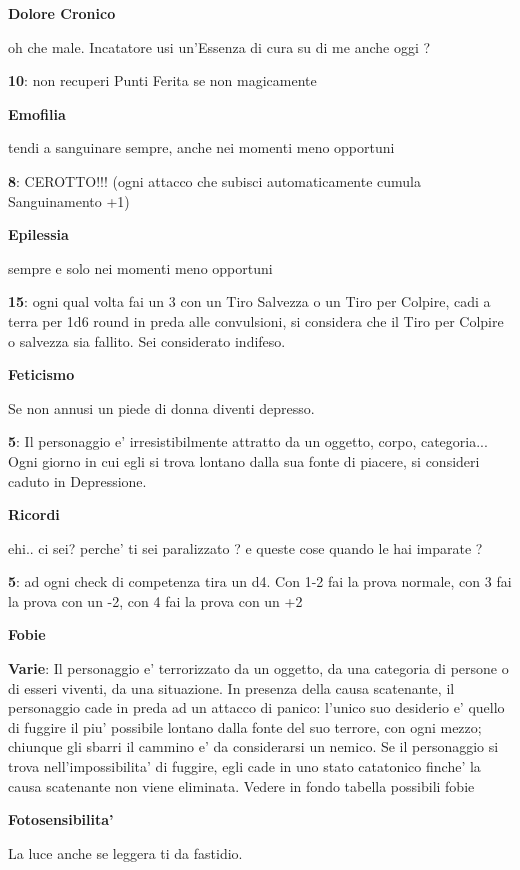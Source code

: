 \documentclass[a4paper,11pt,twoside,openany]{dndbook}
\begin{document}
{\textbf{Dolore Cronico}

oh che male. Incatatore usi un'Essenza di cura su di me anche oggi ?

\textbf{10}: non recuperi Punti Ferita se non magicamente

\textbf{Emofilia}

tendi a sanguinare sempre, anche nei momenti meno opportuni

\textbf{8}: CEROTTO!!! (ogni attacco che subisci automaticamente cumula Sanguinamento +1)

\textbf{Epilessia}

sempre e solo nei momenti meno opportuni

\textbf{15}: ogni qual volta fai un 3 con un Tiro Salvezza o un Tiro per Colpire, cadi a terra per 1d6 round in preda alle convulsioni, si considera che il Tiro per Colpire o salvezza sia fallito. Sei considerato indifeso.

\textbf{Feticismo}

Se non annusi un piede di donna diventi depresso.

\textbf{5}: Il personaggio e' irresistibilmente attratto da un oggetto, corpo, categoria... Ogni giorno in cui egli si trova lontano dalla sua fonte di piacere, si consideri caduto in Depressione.

\textbf{Ricordi}

ehi.. ci sei? perche' ti sei paralizzato ? e queste cose quando le hai imparate ?

\textbf{5}: ad ogni check di competenza tira un d4. Con 1-2 fai la prova normale, con 3 fai la prova con un -2, con 4 fai la prova con un +2

\textbf{Fobie}

\textbf{Varie}: Il personaggio e' terrorizzato da un oggetto, da una categoria di persone o di esseri viventi, da una situazione. In presenza della causa scatenante, il personaggio cade in preda ad un attacco di panico: l'unico suo desiderio e' quello di fuggire il piu' possibile lontano dalla fonte del suo terrore, con ogni mezzo; chiunque gli sbarri il cammino e' da considerarsi un nemico. Se il personaggio si trova nell'impossibilita' di fuggire, egli cade in uno stato catatonico finche' la causa scatenante non viene eliminata. Vedere in fondo tabella possibili fobie

\textbf{Fotosensibilita'}

La luce anche se leggera ti da fastidio.

}
\end{document}
